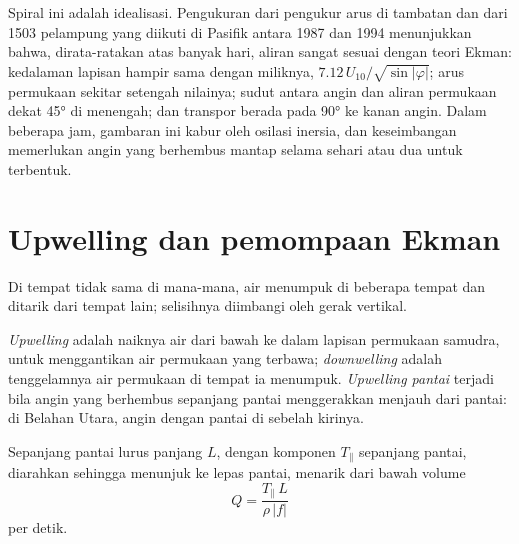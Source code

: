 Spiral ini adalah idealisasi. Pengukuran dari pengukur arus di tambatan dan dari \num{1503} pelampung yang diikuti di Pasifik antara 1987 dan 1994 menunjukkan bahwa, dirata-ratakan atas banyak hari, aliran sangat sesuai dengan teori Ekman: kedalaman lapisan hampir sama dengan miliknya, $7.12\,U_{10}/\sqrt{\sin|\varphi|}$; arus permukaan sekitar setengah nilainya; sudut antara angin dan aliran permukaan dekat \ang{45} di  menengah; dan transpor berada pada \ang{90} ke kanan angin. Dalam beberapa jam, gambaran ini kabur oleh osilasi inersia, dan keseimbangan memerlukan angin yang berhembus mantap selama sehari atau dua untuk terbentuk.

\section{Upwelling dan pemompaan Ekman}\label{sec:b1:ocean-circulation:upwelling}

Di tempat  tidak sama di mana-mana, air menumpuk di beberapa tempat dan ditarik dari tempat lain; selisihnya diimbangi oleh gerak vertikal.

\begin{definition}\label{def:b1:ocean-circulation:upwelling}
\emph{Upwelling} adalah naiknya air dari bawah ke dalam lapisan permukaan samudra,
untuk menggantikan air permukaan yang terbawa; \emph{downwelling}%
 adalah tenggelamnya air permukaan di tempat ia menumpuk.
\emph{Upwelling pantai} terjadi bila angin yang berhembus sepanjang
pantai menggerakkan  menjauh dari pantai: di Belahan Utara, angin dengan pantai di sebelah kirinya.
\end{definition}

\begin{proposition}\label{prop:b1:ocean-circulation:coastal}
Sepanjang pantai lurus panjang $L$,  dengan komponen $T_\parallel$
sepanjang pantai, diarahkan sehingga  menunjuk ke lepas pantai, menarik
dari bawah  volume
\[
  Q = \frac{T_\parallel\,L}{\rho\,|f|}
\]
per detik.
\end{proposition}

